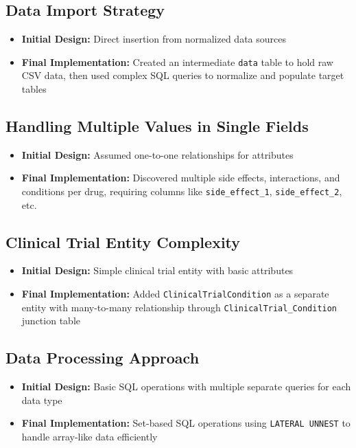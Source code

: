 \documentclass[12pt,a4paper]{article}
\begin{document}
\subsection{Data Import Strategy}
\begin{itemize}
    \item \textbf{Initial Design:} Direct insertion from normalized data sources
    \item \textbf{Final Implementation:} Created an intermediate \texttt{data} table to hold raw CSV data, then used complex SQL queries to normalize and populate target tables
\end{itemize}

\subsection{Handling Multiple Values in Single Fields}
\begin{itemize}
    \item \textbf{Initial Design:} Assumed one-to-one relationships for attributes
    \item \textbf{Final Implementation:} Discovered multiple side effects, interactions, and conditions per drug, requiring columns like \texttt{side\_effect\_1}, \texttt{side\_effect\_2}, etc.
\end{itemize}

\subsection{Clinical Trial Entity Complexity}
\begin{itemize}
    \item \textbf{Initial Design:} Simple clinical trial entity with basic attributes
    \item \textbf{Final Implementation:} Added \texttt{ClinicalTrialCondition} as a separate entity with many-to-many relationship through \texttt{ClinicalTrial\_Condition} junction table
\end{itemize}

\subsection{Data Processing Approach}
\begin{itemize}
    \item \textbf{Initial Design:} Basic SQL operations with multiple separate queries for each data type
    \item \textbf{Final Implementation:} Set-based SQL operations using \texttt{LATERAL UNNEST} to handle array-like data efficiently
\end{itemize}
\end{document}
